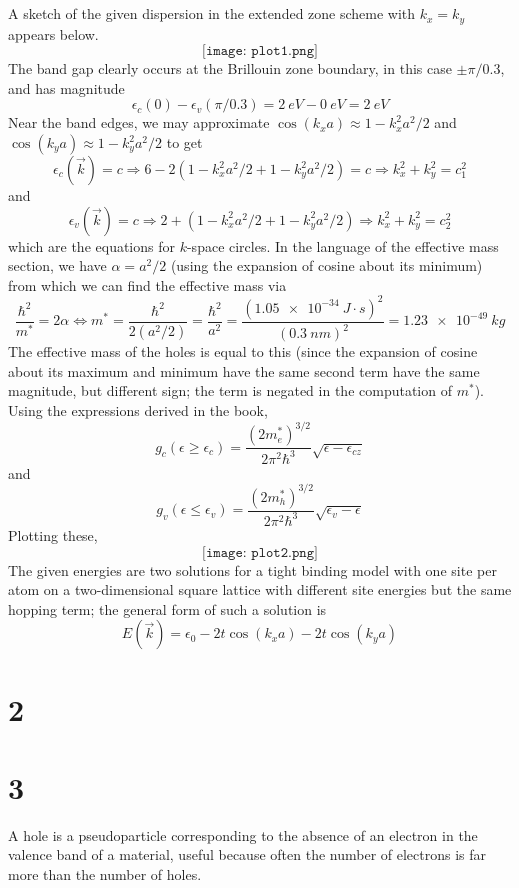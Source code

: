 \documentclass{article}
\begin{document}
\section{}
A sketch of the given dispersion in the extended zone scheme with $k_{x}=k_{y}$ appears below.
\[
  \texttt{[image: plot1.png]}
\]
The band gap clearly occurs at the Brillouin zone boundary, in this case $\pm \pi/0.3$, and has magnitude
\[
  \epsilon_{c}(0)-\epsilon_{v}(\pi/0.3)=\SI{2}{eV}-\SI{0}{eV}=\SI{2}{eV}
\]
Near the band edges, we may approximate $\cos(k_{x}a)\approx 1-k_{x}^{2}a^{2}/2$ and $\cos(k_{y}a)\approx 1-k_{y}^{2}a^{2}/2$ to get
\[
  \epsilon_{c}(\vec{k})=c\Rightarrow 6-2(1-k_{x}^{2}a^{2}/2+1-k_{y}^{2}a^{2}/2)=c
  \Rightarrow k_{x}^{2}+k_{y}^{2}=c_{1}^{2}
\]
and
\[
  \epsilon_{v}(\vec{k})=c \Rightarrow 2+(1-k_{x}^{2}a^{2}/2+1-k_{y}^{2}a^{2}/2)
  \Rightarrow k_{x}^{2}+k_{y}^{2}= c_{2}^{2}
\]
which are the equations for $k$-space circles.
In the language of the effective mass section, we have $\alpha=a^{2}/2$ (using the expansion of cosine about its minimum) from which we can find the effective mass via
\[
  \frac{\hbar^{2}}{m^{*}}=2\alpha
  \Leftrightarrow m^{*}=\frac{\hbar^{2}}{2(a^{2}/2)}=\frac{\hbar^{2}}{a^{2}}
  =\frac{(\SI{1.05e-34}{J\cdot s})^{2}}{(\SI{0.3}{nm})^{2}}
  =\SI{1.23e-49}{kg}
\]
The effective mass of the holes is equal to this (since the expansion of cosine about its maximum and minimum have the same second term
have the same magnitude, but different sign; the term is negated in the computation of $m^{*}$).
Using the expressions derived in the book,
\[
  g_{c}(\epsilon\geq \epsilon_{c})=\frac{(2m_{e}^{*})^{3/2}}{2\pi^{2}\hbar^{3}}\sqrt{\epsilon-\epsilon_{cz}}
\]
and
\[
  g_{v}(\epsilon\leq \epsilon_{v})=\frac{(2m_{h}^{*})^{3/2}}{2\pi^{2}\hbar^{3}}\sqrt{\epsilon_{v}-\epsilon}
\]
Plotting these,
\[
  \texttt{[image: plot2.png]}
\]
The given energies are two solutions for a tight binding model with one site per atom on a two-dimensional square lattice with different
site energies but the same hopping term; the general form of such a solution is
\[
  E(\vec{k})=\epsilon_{0}-2t\cos(k_{x}a)-2t\cos(k_{y}a)
\]
\section*{2}

\section*{3}
A hole is a pseudoparticle corresponding to the absence of an electron in the valence band of a material, useful because often
the number of electrons is far more than the number of holes.
\end{document}
